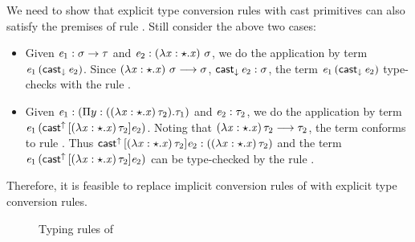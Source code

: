 We need to show that explicit type conversion rules with cast primitives can also satisfy the premises of rule . Still consider the above two cases:
\begin{itemize}
\item Given $\mathit{e_{{\mathrm{1}}}}:\sigma  \rightarrow  \tau$ and $\mathit{e_{{\mathrm{2}}}} : (\lambda  \mathit{x}  :  \star  .  \mathit{x})~\sigma$, we do the application by term $\mathit{e_{{\mathrm{1}}}} \, (  \mathsf{cast}_{\downarrow} \, \mathit{e_{{\mathrm{2}}}}  )$. Since $(\lambda  \mathit{x}  :  \star  .  \mathit{x})~\sigma  \longrightarrow  \sigma$, $\mathsf{cast}_{\downarrow} \, \mathit{e_{{\mathrm{2}}}} : \sigma$, the term $\mathit{e_{{\mathrm{1}}}} \, (  \mathsf{cast}_{\downarrow} \, \mathit{e_{{\mathrm{2}}}}  )$ type-checks with the rule .
\item Given $\mathit{e_{{\mathrm{1}}}} : ( \Pi  y:((  \lambda  \mathit{x}  :  \star  .  \mathit{x}  ) \, \tau_{{\mathrm{2}}}).\tau_{{\mathrm{1}}})$ and $\mathit{e_{{\mathrm{2}}}} : \tau_{{\mathrm{2}}}$, we do the application by term $\mathit{e_{{\mathrm{1}}}} \, (  \mathsf{cast}^{\uparrow} \, [  (  \lambda  \mathit{x}  :  \star  .  \mathit{x}  ) \, \tau_{{\mathrm{2}}}  ]  \mathit{e_{{\mathrm{2}}}}  )$. Noting that $(  \lambda  \mathit{x}  :  \star  .  \mathit{x}  ) \, \tau_{{\mathrm{2}}}  \longrightarrow  \tau_{{\mathrm{2}}}$, the term conforms to rule . Thus $\mathsf{cast}^{\uparrow} \, [  (  \lambda  \mathit{x}  :  \star  .  \mathit{x}  ) \, \tau_{{\mathrm{2}}}  ]  \mathit{e_{{\mathrm{2}}}} : (  (  \lambda  \mathit{x}  :  \star  .  \mathit{x}  ) \, \tau_{{\mathrm{2}}}  )$ and the term $\mathit{e_{{\mathrm{1}}}} \, (  \mathsf{cast}^{\uparrow} \, [  (  \lambda  \mathit{x}  :  \star  .  \mathit{x}  ) \, \tau_{{\mathrm{2}}}  ]  \mathit{e_{{\mathrm{2}}}}  )$ can be type-checked by the rule .
\end{itemize}

Therefore, it is feasible to replace implicit conversion rules of \cc with explicit type conversion rules.

\begin{figure}[ht]
	\ottdefnexprcoc{}
	\caption{Typing rules of \cc}
	\label{fig:ecc:typerule}
\end{figure}

